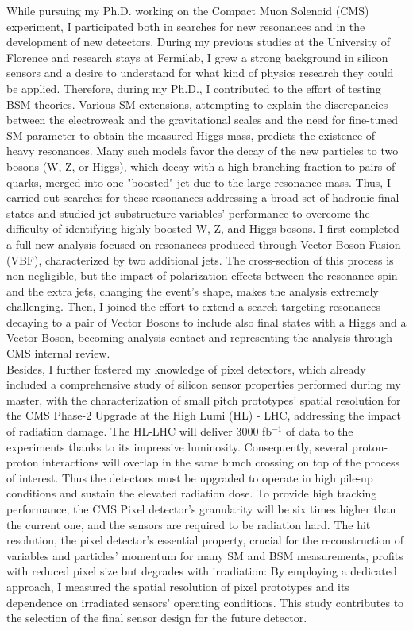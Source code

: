 {\begin{flushleft}
\vspace{\baselineskip}
While pursuing my Ph.D. working on the Compact Muon Solenoid (CMS) experiment, I participated both in searches for new resonances and in the development of new detectors. During my previous studies at the University of Florence and research stays at Fermilab, I grew a strong background in silicon sensors and a desire to understand for what kind of physics research they could be applied. Therefore, during my Ph.D., I contributed to the effort of testing BSM theories. Various SM extensions, attempting to explain the discrepancies between the electroweak and the gravitational scales and the need for fine-tuned SM parameter to obtain the measured Higgs mass, predicts the existence of heavy resonances. Many such models favor the decay of the new particles to two bosons (W, Z, or Higgs), which decay with a high branching fraction to pairs of quarks, merged into one "boosted" jet due to the large resonance mass. Thus, I carried out searches for these resonances addressing a broad set of hadronic final states and studied jet substructure variables' performance to overcome the difficulty of identifying highly boosted W, Z, and Higgs bosons. I first completed a full new analysis focused on resonances produced through Vector Boson Fusion (VBF), characterized by two additional jets. The cross-section of this process is non-negligible, but the impact of polarization effects between the resonance spin and the extra jets, changing the event's shape, makes the analysis extremely challenging. Then, I joined the effort to extend a search targeting resonances decaying to a pair of Vector Bosons to include also final states with a Higgs and a Vector Boson, becoming analysis contact and representing the analysis through CMS internal review. \\
Besides, I further fostered my knowledge of pixel detectors, which already included a comprehensive study of silicon sensor properties performed during my master, with the characterization of small pitch prototypes' spatial resolution for the CMS Phase-2 Upgrade at the High Lumi (HL) - LHC, addressing the impact of radiation damage. The HL-LHC will deliver 3000 fb$^{-1}$ of data to the experiments thanks to its impressive luminosity. Consequently, several proton-proton interactions will overlap in the same bunch crossing on top of the process of interest. Thus the detectors must be upgraded to operate in high pile-up conditions and sustain the elevated radiation dose. To provide high tracking performance, the CMS Pixel detector's granularity will be six times higher than the current one, and the sensors are required to be radiation hard. 
The hit resolution, the pixel detector's essential property, crucial for the reconstruction of variables and particles' momentum for many SM and BSM measurements, profits with reduced pixel size but degrades with irradiation: By employing a dedicated approach, I measured the spatial resolution of pixel prototypes and its dependence on irradiated sensors' operating conditions. This study contributes to the selection of the final sensor design for the future detector. 


\end{flushleft}}
